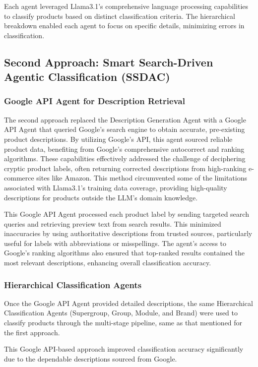 \documentclass[9pt,a4paper,twoside]{rho-class/rho}
\begin{document}
Each agent leveraged Llama3.1’s comprehensive language processing capabilities to classify products based on distinct classification criteria. The hierarchical breakdown enabled each agent to focus on specific details, minimizing errors in classification.

\subsection{Second Approach: Smart Search-Driven Agentic Classification (SSDAC)}

\subsubsection{Google API Agent for Description Retrieval}
The second approach replaced the Description Generation Agent with a Google API Agent that queried Google’s search engine to obtain accurate, pre-existing product descriptions. By utilizing Google’s API, this agent sourced reliable product data, benefiting from Google’s comprehensive autocorrect and ranking algorithms. These capabilities effectively addressed the challenge of deciphering cryptic product labels, often returning corrected descriptions from high-ranking e-commerce sites like Amazon. This method circumvented some of the limitations associated with Llama3.1’s training data coverage, providing high-quality descriptions for products outside the LLM’s domain knowledge.

This Google API Agent processed each product label by sending targeted search queries and retrieving preview text from search results. This minimized inaccuracies by using authoritative descriptions from trusted sources, particularly useful for labels with abbreviations or misspellings. The agent’s access to Google’s ranking algorithms also ensured that top-ranked results contained the most relevant descriptions, enhancing overall classification accuracy.

\subsubsection{Hierarchical Classification Agents}
Once the Google API Agent provided detailed descriptions, the same Hierarchical Classification Agents (Supergroup, Group, Module, and Brand) were used to classify products through the multi-stage pipeline, same as that mentioned for the first approach.

This Google API-based approach improved classification accuracy significantly due to the dependable descriptions sourced from Google.
\end{document}
